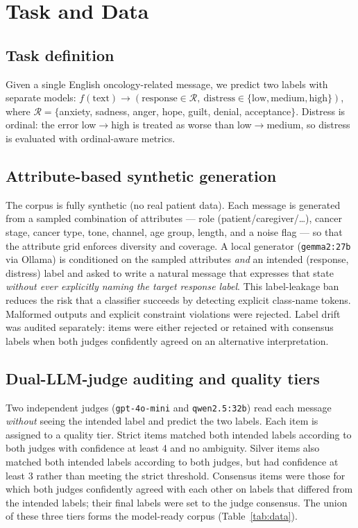 \documentclass[11pt,a4paper]{article}
\begin{document}
\section{Task and Data}

\subsection{Task definition}
Given a single English oncology-related message, we predict two labels with separate models:
$f(\text{text}) \rightarrow (\text{response} \in \mathcal{R},\ \text{distress} \in \{\text{low},
\text{medium}, \text{high}\})$, where $\mathcal{R} = \{$anxiety, sadness, anger, hope, guilt, denial,
acceptance$\}$. Distress is ordinal: the error low$\rightarrow$high is treated as worse than
low$\rightarrow$medium, so distress is evaluated with ordinal-aware metrics.

\subsection{Attribute-based synthetic generation}
The corpus is fully synthetic (no real patient data). Each message is generated from a sampled
combination of attributes --- role (patient/caregiver/\ldots), cancer stage, cancer type, tone,
channel, age group, length, and a noise flag --- so that the attribute grid enforces diversity and
coverage. A local generator (\texttt{gemma2:27b} via Ollama) is conditioned on the sampled attributes
\emph{and} an intended (response, distress) label and asked to write a natural message that expresses
that state \emph{without ever explicitly naming the target response label}. This label-leakage ban reduces the risk that a classifier
succeeds by detecting explicit class-name tokens. Malformed outputs and explicit constraint violations were rejected.
Label drift was audited separately: items were either rejected or retained with consensus labels when
both judges confidently agreed on an alternative interpretation.

\subsection{Dual-LLM-judge auditing and quality tiers}
Two independent judges (\texttt{gpt-4o-mini} and \texttt{qwen2.5:32b}) read each message \emph{without}
seeing the intended label and predict the two labels. Each item is assigned to a quality tier. Strict
items matched both intended labels according to both judges with confidence at least 4 and no
ambiguity. Silver items also matched both intended labels according to both judges, but had confidence
at least 3 rather than meeting the strict threshold. Consensus items were those for which both judges
confidently agreed with each other on labels that differed from the intended labels; their final
labels were set to the judge consensus. The union of these three tiers forms the model-ready corpus
(Table~\ref{tab:data}).
\end{document}
